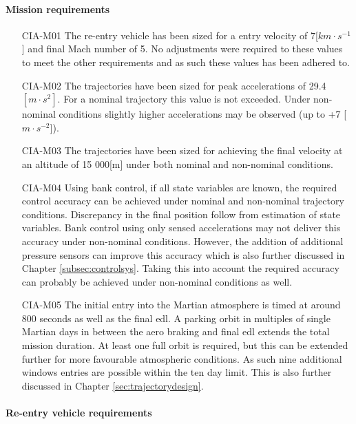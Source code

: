 \paragraph{Mission requirements}
\begin{itemize}[leftmargin=+20mm]
\item[CIA-M01]	The re-entry vehicle has been sized for a entry velocity of 7[$km \cdot s^{-1}$] and final Mach number of 5. No adjustments were required to these values to meet the other requirements and as such these values has been adhered to. 
\item[CIA-M02]	The trajectories have been sized for peak accelerations of 29.4 $[m \cdot s^{2}]$. For a nominal trajectory this value is not exceeded. Under non-nominal conditions slightly higher accelerations may be observed (up to +7 [$m \cdot s ^{-2}$]). 
\item[CIA-M03]  The trajectories have been sized for achieving the final velocity at an altitude of 15 000[m] under both nominal and non-nominal conditions.
\item[CIA-M04]	Using bank control, if all state variables are known, the required control accuracy can be achieved under nominal and non-nominal trajectory conditions. Discrepancy in the final position follow from estimation of state variables. Bank control using only sensed accelerations may not deliver this accuracy under non-nominal conditions. However, the addition of additional pressure sensors can improve this accuracy which is also further discussed in Chapter \ref{subsec:controlsys}. Taking this into account the required accuracy can probably be achieved under non-nominal conditions as well.
\item[CIA-M05] The initial entry into the Martian atmosphere is timed at around 800 seconds as well as the final \gls{edl}. A parking orbit in multiples of single Martian days in between the aero braking and final \gls{edl} extends the total mission duration. At least one full orbit is required, but this can be extended further for more favourable atmospheric conditions. As such nine additional windows entries are possible within the ten day limit. This is also further discussed  in Chapter \ref{sec:trajectorydesign}.

\end{itemize}

\paragraph{Re-entry vehicle requirements}


